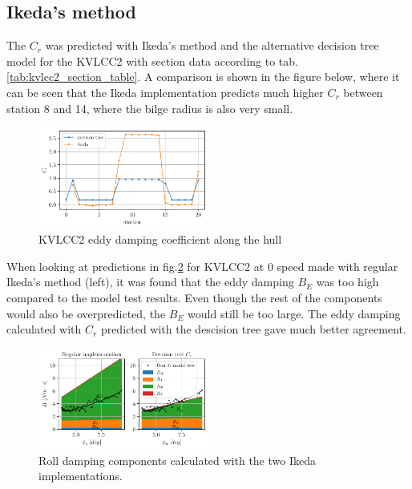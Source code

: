     \subsection{Ikeda's method}\label{ikedas-method}

    The $C_r$ was predicted with Ikeda's method and the alternative
decision tree model for the KVLCC2 with section data according to
tab.\ref{tab:kvlcc2_section_table}. A comparison is shown in the
figure below, where it can be seen that the Ikeda implementation
predicts much higher $C_r$ between station 8 and 14, where the bilge
radius is also very small.

    \begin{figure}[H]
        \begin{center}\includegraphics[width = 0.5\textwidth]{figures/kvlcc2_eddy.pdf}\end{center}
        \vspace{-1cm}
        \caption{KVLCC2 eddy damping coefficient along the hull}
        \label{fig:kvlcc2_eddy}
    \end{figure}
    
    When looking at predictions in fig.\ref{fig:ikeda} for KVLCC2 at
0 speed made with regular Ikeda's method (left), it was found that the
eddy damping $B_E$ was too high compared to the model test results.
Even though the rest of the components would also be overpredicted, the
$B_E$ would still be too large. The eddy damping calculated with
$C_r$ predicted with the descision tree gave much better agreement.

    

    \begin{figure}[H]
        \begin{center}\includegraphics[width = 0.5\textwidth]{figures/ikeda.pdf}\end{center}
        \vspace{-1cm}
        \caption{Roll damping components calculated with the two Ikeda implementations.}
        \label{fig:ikeda}
    \end{figure}
    
